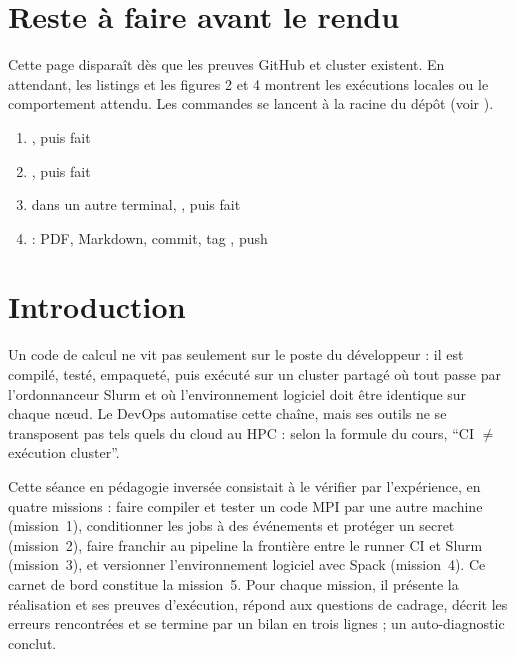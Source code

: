 \documentclass[11pt,a4paper]{article}
\newcommand{\fic}[1]{\code{#1}}
\begin{document}
\section*{\textcolor{red!70!black}{Reste à faire avant le rendu}}
{\color{red!70!black}\small Cette page disparaît dès que les preuves GitHub et cluster existent.
En attendant, les listings et les figures 2 et 4 montrent les exécutions locales ou le
comportement attendu. Les commandes se lancent à la racine du dépôt (voir \fic{README.md}).}
\begin{enumerate}
\item {}, puis 
\ifghdemo\enskip\textcolor{OliveGreen}{fait}\fi
\item {}, puis 
\ifromeo\enskip\textcolor{OliveGreen}{fait}\fi
\item {} dans un autre terminal,
, puis 
\ifghhpc\enskip\textcolor{OliveGreen}{fait}\fi
\item {} : PDF, Markdown, commit, tag , push
\end{enumerate}
\clearpage
\setcounter{page}{1}
\fi

\section{Introduction}

Un code de calcul ne vit pas seulement sur le poste du développeur : il est compilé, testé,
empaqueté, puis exécuté sur un cluster partagé où tout passe par l'ordonnanceur Slurm et où
l'environnement logiciel doit être identique sur chaque nœud. Le DevOps automatise cette
chaîne, mais ses outils ne se transposent pas tels quels du cloud au HPC : selon la formule du
cours, \enquote{CI $\neq$ exécution cluster}.

Cette séance en pédagogie inversée consistait à le vérifier par l'expérience, en quatre
missions : faire compiler et tester un code MPI par une autre machine (mission~1), conditionner
les jobs à des événements et protéger un secret (mission~2), faire franchir au pipeline la
frontière entre le runner CI et Slurm (mission~3), et versionner l'environnement logiciel avec
Spack (mission~4). Ce carnet de bord constitue la mission~5. Pour chaque mission, il présente la
réalisation et ses preuves d'exécution, répond aux questions de cadrage, décrit les erreurs
rencontrées et se termine par un bilan en trois lignes ; un auto-diagnostic conclut.
\end{document}
